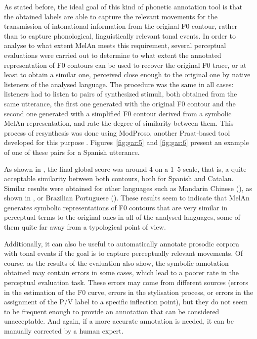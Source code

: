 \documentclass[output=paper]{langsci/langscibook}
\begin{document}
As stated before, the ideal goal of this kind of phonetic annotation tool is that the obtained labels are able to capture the relevant movements for the transmission of intonational information from the original F0 contour, rather than to capture phonological, linguistically relevant tonal events. In order to analyse to what extent MelAn meets this requirement, several perceptual evaluations were carried out to determine to what extent the annotated representation of F0 contours can be used to recover the original F0 trace, or at least to obtain a similar one, perceived close enough to the original one by native listeners of the analysed language. The procedure was the same in all cases: listeners had to listen to pairs of synthesized stimuli, both obtained from the same utterance, the first one generated with the original F0 contour and the second one generated with a simplified F0 contour derived from a symbolic MelAn representation, and rate the degree of similarity between them. This process of resynthesis was done using ModProso, another Praat-based tool developed for this purpose \citep{Garrido2013ModProso}. Figures~\ref{fig:gar:5} and \ref{fig:gar:6} present an example of one of these pairs for a Spanish utterance. 

 

As shown in , the final global score was around 4 on a 1--5 scale, that is, a quite acceptable similarity between both contours, both for Spanish and Catalan. Similar results were obtained for other languages such as Mandarin Chinese (\citealt{Yao2010}), as shown in , or Brazilian Portuguese (\citealt{ConceicaoSilva.2016}). These results seem to indicate that MelAn generates symbolic representations of F0 contours that are very similar in perceptual terms to the original ones in all of the analysed languages, some of them quite far away from a typological point of view. 

Additionally, it can also be useful to automatically annotate prosodic corpora with tonal events if the goal is to capture perceptually relevant movements. Of course, as the results of the evaluation also show, the symbolic annotation obtained may contain errors in some cases, which lead to a poorer rate in the perceptual evaluation task. These errors may come from different sources (errors in the estimation of the F0 curve, errors in the stylisation process, or errors in the assignment of the P/V label to a specific inflection point), but they do not seem to be frequent enough to provide an annotation that can be considered unacceptable. And again, if a more accurate annotation is needed, it can be manually corrected by a human expert.
\end{document}
